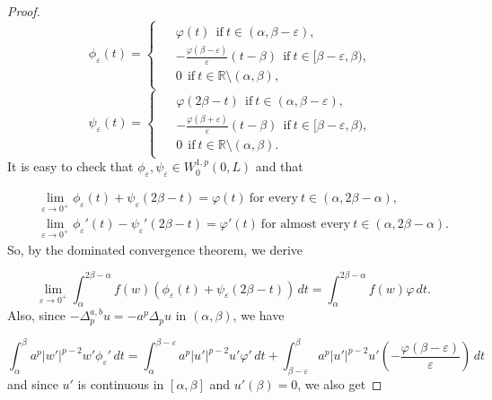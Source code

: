 \documentclass[a4paper,11pt]{article}
\begin{document}
{\begin{proof}
\begin{equation*}
\phi_{\varepsilon}(t) =
\begin{cases}
\begin{aligned}
     & \varphi(t) \ \ \text{if} \ t \in (\alpha, \beta - \varepsilon), \\
     & -\frac{\varphi(\beta - \varepsilon)}{\varepsilon}(t - \beta) \ \ \text{if} \ t \in [\beta - \varepsilon, \beta), \\
     & 0 \ \ \text{if} \ t \in \mathbb{R} \setminus (\alpha, \beta),
\end{aligned}
\end{cases}
\end{equation*}
\begin{equation*}
\psi_{\varepsilon}(t) =
\begin{cases}
\begin{aligned}
     & \varphi(2\beta - t) \ \ \text{if} \ t \in (\alpha, \beta - \varepsilon), \\
     & -\frac{\varphi(\beta + \varepsilon)}{\varepsilon}(t-\beta) \ \ \text{if} \ t \in [\beta - \varepsilon, \beta), \\
     & 0 \ \ \text{if} \ t \in \mathbb{R} \setminus (\alpha, \beta).
\end{aligned}
\end{cases}
\end{equation*}
It is easy to check that $\phi_{\varepsilon},\psi_{\varepsilon} \in W^{1,p}_0(0,L)$ and that

\begin{eqnarray*}
&& \lim_{\varepsilon \to 0^{+}} \phi_{\varepsilon}(t) + \psi_{\varepsilon}(2\beta - t) = \varphi(t) \ \text{for every} \ t \in (\alpha, 2\beta - \alpha),\\
&& \lim_{\varepsilon \to 0^{+}} \phi_{\varepsilon}'(t) - \psi_{\varepsilon}'(2\beta - t) = \varphi'(t) \ \text{for almost every} \ t \in (\alpha, 2\beta - \alpha).
\end{eqnarray*}
So, by the dominated convergence theorem, we derive

\begin{equation}\label{limu+1}
\lim_{\varepsilon \to 0^{+}} \int_{\alpha}^{2\beta - \alpha}f(w)\left(\phi_{\varepsilon}(t) + \psi_{\varepsilon}(2\beta - t)\right)\, dt = \int_{\alpha}^{2\beta - \alpha}f(w)\varphi \, dt.
\end{equation}
Also, since $-\Delta_{p}^{a,b}u = -a^{p}\Delta_{p}u$ in $(\alpha,\beta)$, we have

\[
\int_{\alpha}^{\beta} a^{p}|w'|^{p-2} w'\phi_{\varepsilon}' \, dt = \int_{\alpha}^{\beta - \varepsilon} a^{p}|u'|^{p-2}u'\varphi' \, dt + \int_{\beta - \varepsilon}^{\beta} a^{p}|u'|^{p-2}u'\left(-\frac{\varphi(\beta - \varepsilon)}{\varepsilon}\right) \, dt
\]
and since $u'$ is continuous in $[\alpha, \beta]$ and $u'(\beta) = 0$, we also get


\end{proof}}
\end{document}
